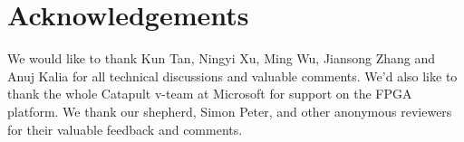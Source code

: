\section*{Acknowledgements}

We would like to thank Kun Tan, Ningyi Xu, Ming Wu, Jiansong Zhang and Anuj Kalia for all technical discussions and valuable comments.
We'd also like to thank the whole Catapult v-team at Microsoft for support on the FPGA platform.
We thank our shepherd, Simon Peter, and other anonymous reviewers for their valuable feedback and comments.
